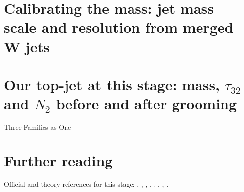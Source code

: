 \section{Calibrating the mass: jet mass scale and resolution from merged W jets}
\label{sec:three_families:calibrating_the_mass_jet_mass_scale_and_}

\section{Our top-jet at this stage: mass, $\tau_{32}$ and $N_2$ before and after grooming}
\label{sec:three_families:our_top_jet_at_this_stage_mass_tau_32_an}

\begin{ledger}{Three Families as One}
\end{ledger}

\section{Further reading}
\label{sec:three_families:further_reading}
Official and theory references for this stage: \cite{Larkoski:2014wba}, \cite{Dasgupta:2013ihk}, \cite{Krohn:2009th}, \cite{Ellis:2009su}, \cite{Thaler:2010tr}, \cite{Larkoski:2013eya}, \cite{Dreyer:2018nbf}, \cite{CMS:2020poo}.

\begin{pitfalls}
\end{pitfalls}

\begin{exercises}
\item {}
\item {}
\end{exercises}

